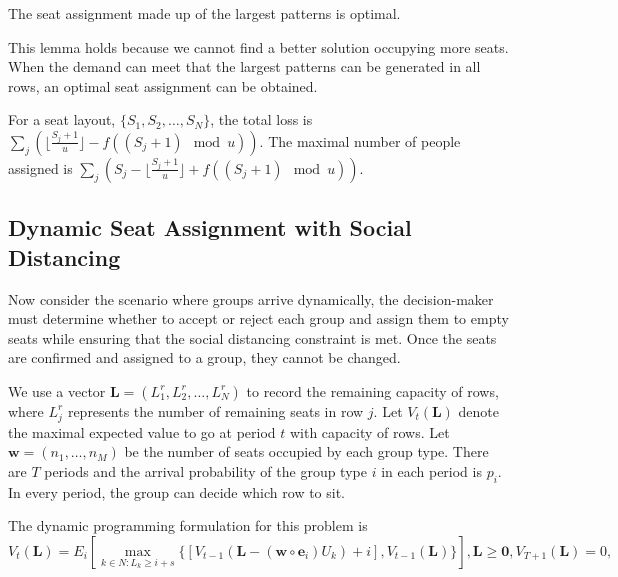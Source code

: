 \begin{lem}
The seat assignment made up of the largest patterns is optimal.
\end{lem}

This lemma holds because we cannot find a better solution occupying more seats. When the demand can meet that the largest patterns can be generated in all rows, an optimal seat assignment can be obtained.

\begin{prop}
For a seat layout, $\{S_1, S_2, \ldots, S_{N}\}$, the total loss is $\sum_{j} (\lfloor \frac{S_j+1}{u}  \rfloor - f((S_j +1)\mod u))$. The maximal number of people assigned is $\sum_{j} (S_j - \lfloor \frac{S_j+1}{u} \rfloor + f((S_j +1)\mod u))$.
\end{prop}

\subsection{Dynamic Seat Assignment with Social Distancing}


Now consider the scenario where groups arrive dynamically, the decision-maker must determine whether to accept or reject each group and assign them to empty seats while ensuring that the social distancing constraint is met. Once the seats are confirmed and assigned to a group, they cannot be changed.

We use a vector $\mathbf{L}= (L^{r}_1, L^{r}_2, \ldots, L^{r}_{N})$ to record the remaining capacity of rows, where $L^{r}_{j}$ represents the number of remaining seats in row $j$. Let $V_{t}(\mathbf{L})$ denote the maximal expected value to go at period $t$ with capacity of rows. Let $\mathbf{w} = (n_1, \ldots, n_{M})$ be the number of seats occupied by each group type. There are $T$ periods and the arrival probability of the group type $i$ in each period is $p_i$. In every period, the group can decide which row to sit.

The dynamic programming formulation for this problem is
$$V_{t}(\mathbf{L}) = E_{i} \left[ \max_{k \in N: L_k \geq i + s} \{ {[V_{t-1}(\mathbf{L}- (\mathbf{w} \circ \mathbf{e}_{i})U_{k})+ i]}, {V_{t-1}(\mathbf{L})}\} \right], \mathbf{L} \geq \mathbf{0}, V_{T+1}(\mathbf{L}) = 0,$$

